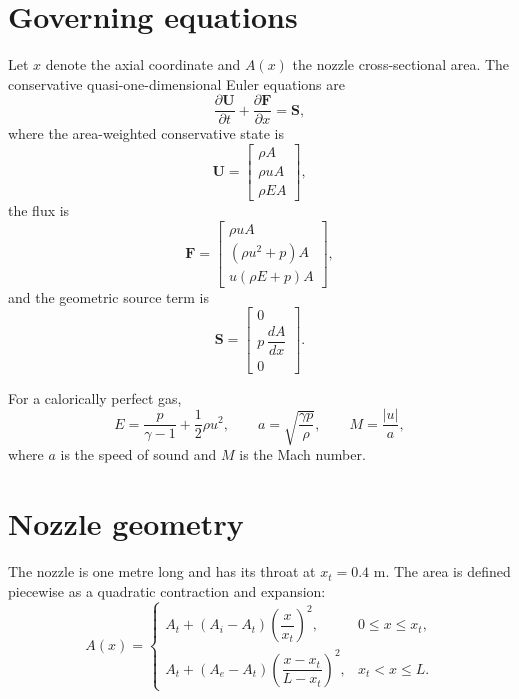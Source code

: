 \documentclass[11pt,a4paper]{article}
\begin{document}
\section{Governing equations}
Let $x$ denote the axial coordinate and $A(x)$ the nozzle cross-sectional area.
The conservative quasi-one-dimensional Euler equations are
\begin{equation}
  \frac{\partial \mathbf U}{\partial t}
  + \frac{\partial \mathbf F}{\partial x}
  = \mathbf S,
\end{equation}
where the area-weighted conservative state is
\begin{equation}
  \mathbf U =
  \begin{bmatrix}
    \rho A\\
    \rho u A\\
    \rho E A
  \end{bmatrix},
\end{equation}
the flux is
\begin{equation}
  \mathbf F =
  \begin{bmatrix}
    \rho u A\\
    (\rho u^2+p)A\\
    u(\rho E+p)A
  \end{bmatrix},
\end{equation}
and the geometric source term is
\begin{equation}
  \mathbf S =
  \begin{bmatrix}
    0\\
    p\,\dfrac{dA}{dx}\\
    0
  \end{bmatrix}.
\end{equation}

For a calorically perfect gas,
\begin{equation}
  E = \frac{p}{\gamma-1}+\frac{1}{2}\rho u^2,
  \qquad
  a = \sqrt{\frac{\gamma p}{\rho}},
  \qquad
  M = \frac{|u|}{a},
\end{equation}
where $a$ is the speed of sound and $M$ is the Mach number.

\section{Nozzle geometry}
The nozzle is one metre long and has its throat at $x_t=0.4$ m. The area is
defined piecewise as a quadratic contraction and expansion:
\begin{equation}
A(x)=
\begin{cases}
A_t+(A_i-A_t)\left(\dfrac{x}{x_t}\right)^2, & 0\leq x\leq x_t,\\[1.2ex]
A_t+(A_e-A_t)\left(\dfrac{x-x_t}{L-x_t}\right)^2,
&x_t < x\leq L.
\end{cases}
\end{equation}
\end{document}
